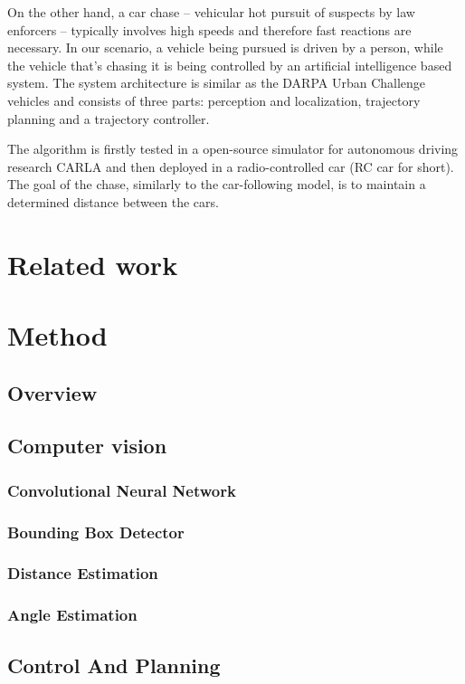  
On the other hand, a car chase -- vehicular hot pursuit of suspects by law enforcers -- typically involves high speeds and therefore fast reactions are necessary. In our scenario, a vehicle being pursued is driven by a person, while the vehicle that's chasing it is being controlled by an artificial intelligence based system. The system architecture is similar as the DARPA Urban Challenge vehicles \cite{Bertha}\cite{darpa2}\cite{darpa_book} and consists of three parts: perception and localization, trajectory planning and a trajectory controller. \par


The algorithm is firstly tested in a open-source simulator for autonomous driving research CARLA and then deployed in a radio-controlled car (RC car for short). The goal of the chase, similarly to the car-following model, is to maintain a determined distance between the cars.

\chapter{Related work}

\chapter{Method}
\section{Overview}

\section{Computer vision}
\subsection{Convolutional Neural Network}
\subsection{Bounding Box Detector}
\subsection{Distance Estimation}
\subsection{Angle Estimation}

\section{Control And Planning}
